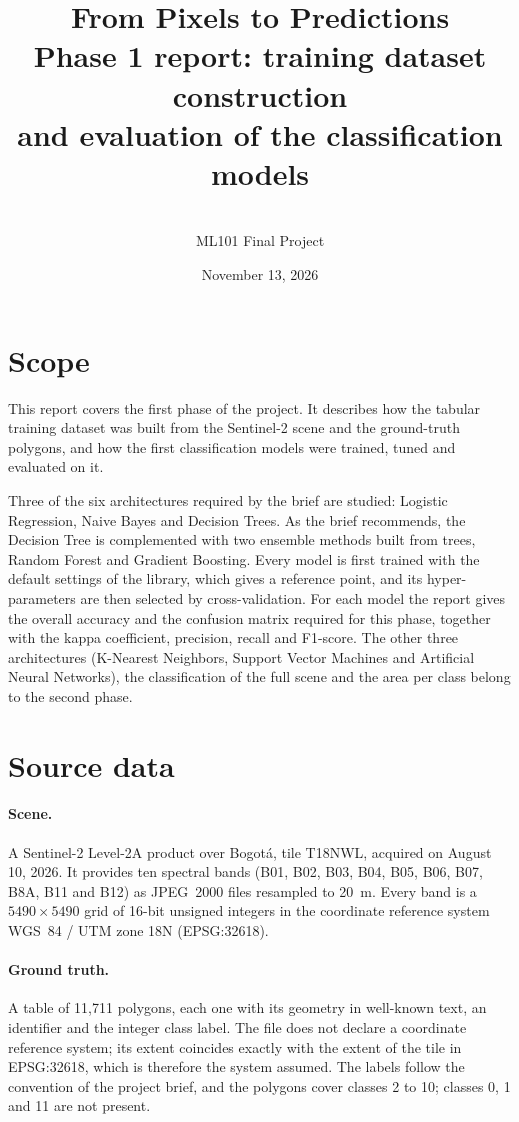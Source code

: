 \documentclass[11pt,a4paper]{article}
\title{From Pixels to Predictions\\[0.3em]
\large Phase 1 report: training dataset construction\\
and evaluation of the classification models}
\author{\reportauthors\\[0.3em] ML101 Final Project}
\date{November 13, 2026}
\begin{document}
\maketitle

\section{Scope}

This report covers the first phase of the project. It describes how the
tabular training dataset was built from the Sentinel-2 scene and the
ground-truth polygons, and how the first classification models were trained,
tuned and evaluated on it.

Three of the six architectures required by the brief are studied: Logistic
Regression, Naive Bayes and Decision Trees. As the brief recommends, the
Decision Tree is complemented with two ensemble methods built from trees,
Random Forest and Gradient Boosting. Every model is first trained with the
default settings of the library, which gives a reference point, and its
hyper-parameters are then selected by cross-validation. For each model the
report gives the overall accuracy and the confusion matrix required for this
phase, together with the kappa coefficient, precision, recall and F1-score.
The other three architectures (K-Nearest Neighbors, Support Vector Machines
and Artificial Neural Networks), the classification of the full scene and the
area per class belong to the second phase.

\section{Source data}

\paragraph{Scene.} A Sentinel-2 Level-2A product over Bogot\'a, tile T18NWL,
acquired on August 10, 2026. It provides ten spectral bands (B01, B02, B03,
B04, B05, B06, B07, B8A, B11 and B12) as JPEG~2000 files resampled to 20~m.
Every band is a $5490 \times 5490$ grid of 16-bit unsigned integers in the
coordinate reference system WGS~84 / UTM zone 18N (EPSG:32618).

\paragraph{Ground truth.} A table of 11,711 polygons, each one with its
geometry in well-known text, an identifier and the integer class label. The
file does not declare a coordinate reference system; its extent coincides
exactly with the extent of the tile in EPSG:32618, which is therefore the
system assumed. The labels follow the convention of the project brief, and
the polygons cover classes 2 to 10; classes 0, 1 and 11 are not present.
\end{document}
